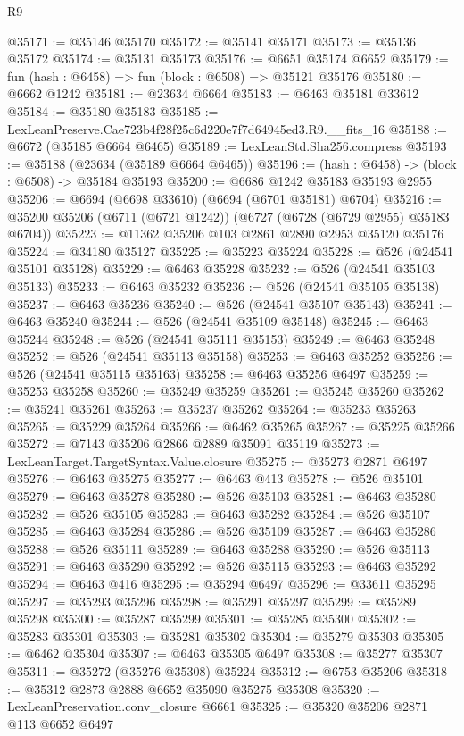 \begin{lexlean}{R9}
\begin{coremodule}
@35171 := @35146 @35170
@35172 := @35141 @35171
@35173 := @35136 @35172
@35174 := @35131 @35173
@35176 := @6651 @35174 @6652
@35179 := fun (hash : @6458) => fun (block : @6508) => @35121 @35176
@35180 := @6662 @1242
@35181 := @23634 @6664
@35183 := @6463 @35181 @33612
@35184 := @35180 @35183
@35185 := LexLeanPreserve.Cae723b4f28f25c6d220e7f7d64945ed3.R9.__fits_16
@35188 := @6672 (@35185 @6664 @6465)
@35189 := LexLeanStd.Sha256.compress
@35193 := @35188 (@23634 (@35189 @6664 @6465))
@35196 := (hash : @6458) -> (block : @6508) -> @35184 @35193
@35200 := @6686 @1242 @35183 @35193 @2955
@35206 := @6694 (@6698 @33610) (@6694 (@6701 @35181) @6704)
@35216 := @35200 @35206 (@6711 (@6721 @1242)) (@6727 (@6728 (@6729 @2955) @35183 @6704))
@35223 := @11362 @35206 @103 @2861 @2890 @2953 @35120 @35176
@35224 := @34180 @35127
@35225 := @35223 @35224
@35228 := @526 (@24541 @35101 @35128)
@35229 := @6463 @35228
@35232 := @526 (@24541 @35103 @35133)
@35233 := @6463 @35232
@35236 := @526 (@24541 @35105 @35138)
@35237 := @6463 @35236
@35240 := @526 (@24541 @35107 @35143)
@35241 := @6463 @35240
@35244 := @526 (@24541 @35109 @35148)
@35245 := @6463 @35244
@35248 := @526 (@24541 @35111 @35153)
@35249 := @6463 @35248
@35252 := @526 (@24541 @35113 @35158)
@35253 := @6463 @35252
@35256 := @526 (@24541 @35115 @35163)
@35258 := @6463 @35256 @6497
@35259 := @35253 @35258
@35260 := @35249 @35259
@35261 := @35245 @35260
@35262 := @35241 @35261
@35263 := @35237 @35262
@35264 := @35233 @35263
@35265 := @35229 @35264
@35266 := @6462 @35265
@35267 := @35225 @35266
@35272 := @7143 @35206 @2866 @2889 @35091 @35119
@35273 := LexLeanTarget.TargetSyntax.Value.closure
@35275 := @35273 @2871 @6497
@35276 := @6463 @35275
@35277 := @6463 @413
@35278 := @526 @35101
@35279 := @6463 @35278
@35280 := @526 @35103
@35281 := @6463 @35280
@35282 := @526 @35105
@35283 := @6463 @35282
@35284 := @526 @35107
@35285 := @6463 @35284
@35286 := @526 @35109
@35287 := @6463 @35286
@35288 := @526 @35111
@35289 := @6463 @35288
@35290 := @526 @35113
@35291 := @6463 @35290
@35292 := @526 @35115
@35293 := @6463 @35292
@35294 := @6463 @416
@35295 := @35294 @6497
@35296 := @33611 @35295
@35297 := @35293 @35296
@35298 := @35291 @35297
@35299 := @35289 @35298
@35300 := @35287 @35299
@35301 := @35285 @35300
@35302 := @35283 @35301
@35303 := @35281 @35302
@35304 := @35279 @35303
@35305 := @6462 @35304
@35307 := @6463 @35305 @6497
@35308 := @35277 @35307
@35311 := @35272 (@35276 @35308) @35224
@35312 := @6753 @35206
@35318 := @35312 @2873 @2888 @6652 @35090 @35275 @35308
@35320 := LexLeanPreservation.conv_closure @6661
@35325 := @35320 @35206 @2871 @113 @6652 @6497

\end{coremodule}
\end{lexlean}
